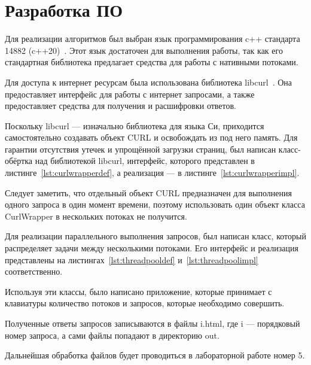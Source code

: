 \chapter{Разработка ПО}

Для реализации алгоритмов был выбран язык программирования c++ стандарта 14882 (c++20)~\cite{cpp}. Этот язык достаточен для выполнения работы, так как его стандартная библиотека предлагает средства для работы с нативными потоками.

Для доступа к интернет ресурсам была использована библиотека libcurl~\cite{curl}. Она предоставляет интерфейс для работы с интернет запросами, а также предоставляет средства для получения и расшифровки ответов.

Поскольку libcurl --- изначально библиотека для языка Си, приходится самостоятельно создавать объект CURL и освобождать из под него память. Для гарантии отсутствия утечек и упрощённой загрузки страниц, был написан класс-обёртка над библиотекой libcurl, интерфейс, которого представлен в листинге~\ref{lst:curlwrapperdef}, а реализация --- в листинге~\ref{lst:curlwrapperimpl}.





Следует заметить, что отдельный объект CURL предназначен для выполнения одного запроса в один момент времени, поэтому использовать один объект класса CurlWrapper в нескольких потоках не получится.

Для реализации параллельного выполнения запросов, был написан класс, который распределяет задачи между несколькими потоками. Его интерфейс и реализация представлены на листингах~\ref{lst:threadpooldef} и~\ref{lst:threadpoolimpl} соответственно.






Используя эти классы, было написано приложение, которые принимает с клавиатуры количество потоков и запросов, которые необходимо совершить.

Полученные ответы запросов записываются в файлы i.html, где i --- порядковый номер запроса, а сами файлы попадают в директорию out.

Дальнейшая обработка файлов будет проводиться в лабораторной работе номер 5.